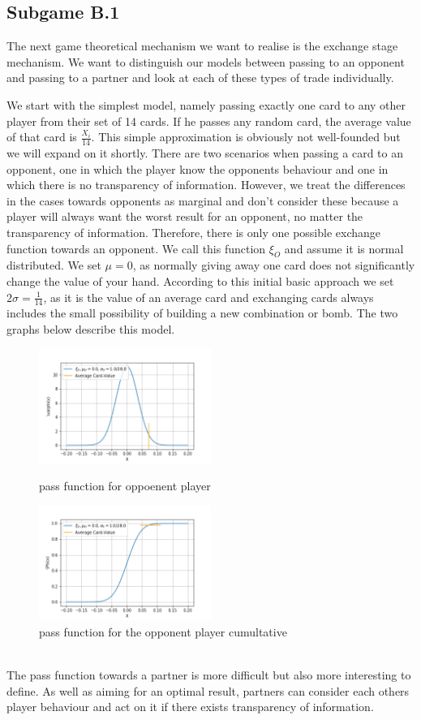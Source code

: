 \subsection{Subgame B.1}
The next game theoretical mechanism we want to realise is the exchange stage mechanism. We want to distinguish our models between passing to an opponent and passing to a partner and look at each of these types of trade individually. 

We start with the simplest model, namely passing exactly one card to any other player from their set of 14 cards. If he passes any random card, the average value of that card is $\frac{X_i}{14}$. This simple approximation is obviously not well-founded but we will expand on it shortly. There are two scenarios when passing a card to an opponent, one in which the player know the opponents behaviour and one in which there is no transparency of information. However, we treat the differences in the cases towards opponents as marginal and don’t consider these because a player will always want the worst result for an opponent, no matter the transparency of information. Therefore, there is only one possible exchange function towards an opponent. We call this function $\xi_O$ and assume it is normal distributed. We set $\mu = 0$, as normally giving away one card does not significantly change the value of your hand. According to this initial basic approach we set $2\sigma = \frac{1}{14}$, as it is the value of an average card and exchanging cards always includes the small possibility of building a new combination or bomb. The two graphs below describe this model.
 \\
\begin{figure}[h]
    \centering
    \includegraphics[width=0.5\textwidth]{Bilder/pass_function_ot}
    \caption{pass function for oppoenent player}
    \label{fig:meine-grafik}
    \centering
    \includegraphics[width=0.5\textwidth]{Bilder/pass_function_ot_cumultative}
    \caption{pass function for the opponent player cumultative}
    \label{fig:meine-grafik}
\end{figure}
\\
The pass function towards a partner is more difficult but also more interesting to define. As well as aiming for an optimal result, partners can consider each others player behaviour and act on it if there exists transparency of information.

